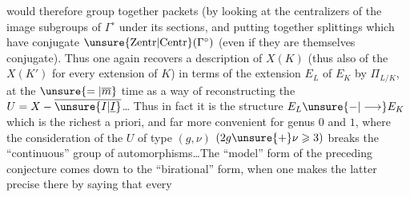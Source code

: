 would therefore group together   packets
(by looking at the centralizers of the image subgroups
of $\Gamma^\circ$ under its sections, and 
putting together splittings which have conjugate
$\unsure{\mathrm{Zentr}|\mathrm{Centr}}(\Gamma^\circ)$ (even if they are 
themselves conjugate). Thus one again recovers
a description of $X(K)$ (thus
also of the $X(K')$ for every  extension  of $K$)
in terms of the extension $E_L$ of $E_K$ by
$\Pi_{L/K}$, at the $\unsure{=|\overline m}$ time as a way of
reconstructing the $U=X-\overline{\unsure{I|\underline I}}$\ldots
Thus in fact it is the structure $E_L\unsure{-|\longrightarrow}E_K$
which is the richest a priori, and far
more convenient for genus $0$ and $1$,
where the consideration of the $U$ of type $(g,\nu)$
$(2g\unsure{+}\nu\geqslant3)$ breaks the ``continuous'' group
of automorphisms\ldots The ``model'' form
of the preceding conjecture comes down
to the ``birational'' form, when one
makes the latter precise there by saying that every
